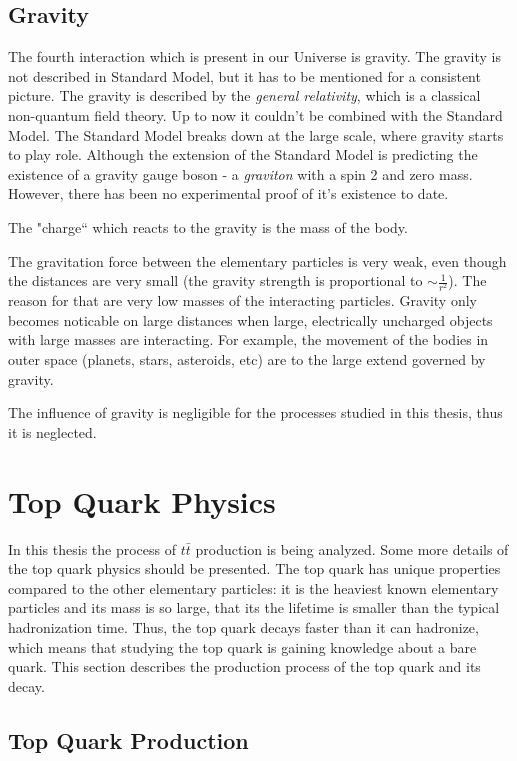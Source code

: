 \subsection{Gravity}

The fourth interaction which is present in our Universe is gravity. The gravity is not described in Standard Model, but it has to be mentioned for a consistent 
picture. The gravity is described by the \textit{general relativity}, which is a classical non-quantum field theory. Up to now it couldn't be combined with the
Standard Model. The Standard Model breaks down at the large scale, where gravity starts to play role. Although the extension of the Standard Model is predicting 
the existence of a gravity gauge boson - a \textit{graviton} with a spin 2 and zero mass. However, there has been no experimental proof of it's existence to date.

The "charge`` which reacts to the gravity is the mass of the body.

The gravitation force between the elementary particles is very weak, even though the distances are very small (the gravity strength is proportional to $\sim\frac{1}{r^{2}}$). 
The reason for that are very low masses of the interacting particles. Gravity only becomes noticable
on large distances when large, electrically uncharged objects with large masses are interacting. For example, the movement of the bodies in outer space 
(planets, stars, asteroids, etc) are to the large extend governed by gravity. 

The influence of gravity is negligible for the processes studied in this thesis, thus it is neglected.

\section{Top Quark Physics}

In this thesis the process of $t\bar{t}$ production is being analyzed. Some more details of the top quark physics should be presented.
The top quark has unique properties compared to the other elementary particles: it is the heaviest known elementary particles and its mass is so large, that its the lifetime 
is smaller than the typical hadronization time. Thus, the top quark decays 
faster than it can hadronize, which means that studying the top quark is gaining knowledge about a bare quark. This section describes the production process of the top quark and its decay.

\subsection{Top Quark Production}\label{ssec:tprod}

